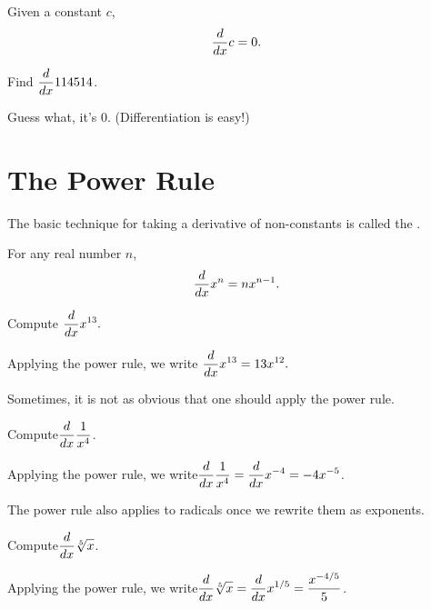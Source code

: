 \begin{theorem}
    Given a constant $c$,
    $$\displaystyle\frac{d}{dx} c = 0.$$
\end{theorem}

\begin{example}
    Find $\displaystyle\displaystyle\frac{d}{dx} 114514$.\\
    \begin{solution}
        Guess what, it's 0. (Differentiation is easy!)
    \end{solution}
\end{example}

\section{The Power Rule}
The basic technique for taking a derivative of non-constants is called the .

\begin{theorem}\label{T:powerrule}
    For any real number $n$, 
    $$\displaystyle\frac{d}{dx} x^n = n x^{n-1}.$$
\end{theorem}

\begin{example}
    Compute $\displaystyle\frac{d}{dx} x^{13}.$ \cite{mooc}\\
    \begin{solution}
    Applying the power rule, we write
    $\displaystyle\frac{d}{dx} x^{13} = 13x^{12}.$
    \end{solution}
\end{example}

Sometimes, it is not as obvious that one should apply the power rule.\\

\begin{example}
Compute$\displaystyle\frac{d}{dx} \frac{1}{x^4}$. \cite{mooc}\\
\begin{solution}
Applying the power rule, we write$\displaystyle\frac{d}{dx} \frac{1}{x^4} = \displaystyle\frac{d}{dx} x^{-4} = -4x^{-5}$.
\end{solution}
\end{example}

The power rule also applies to radicals once we rewrite them as exponents.\\

\begin{example}
Compute$\displaystyle\frac{d}{dx} \sqrt[5]{x}$. \cite{mooc}\\
\begin{solution}
Applying the power rule, we write$\displaystyle\frac{d}{dx} \sqrt[5]{x} = \displaystyle\frac{d}{dx} x^{1/5} = \frac{x^{-4/5}}{5}$.
\end{solution}
\end{example}

